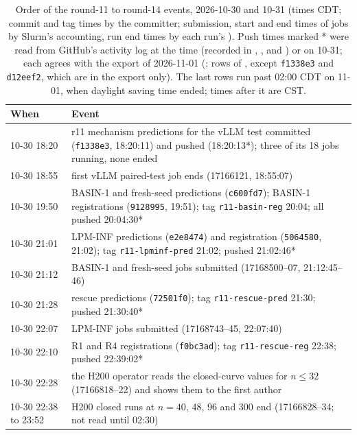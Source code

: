 \begin{table}[tbp]
\centering\footnotesize
\caption{Order of the round-11 to round-14 events, 2026-10-30 and 10-31 (times CDT; commit and tag times by the committer; submission, start and end times of jobs by Slurm's accounting, run end times by each run's ). Push times marked * were read from GitHub's activity log at the time (recorded in , , and ) or on 10-31; each agrees with the export of 2026-11-01 (; rows of , except \texttt{f1338e3} and \texttt{d12eef2}, which are in the export only). The last rows run past 02:00 CDT on 11-01, when daylight saving time ended; times after it are CST.}\label{tab:timeline-r11}
\begin{tabular}{@{}p{2.3cm} >{\raggedright\arraybackslash}p{14.4cm}@{}}
\toprule
When & Event\\
\midrule
10-30 18:20 & r11 mechanism predictions for the vLLM test committed (\texttt{f1338e3}, 18:20:11) and pushed (18:20:13*); three of its 18 jobs running, none ended\\
10-30 18:55 & first vLLM paired-test job ends (17166121, 18:55:07)\\
10-30 19:50 & BASIN-1 and fresh-seed predictions (\texttt{c600fd7}); BASIN-1 registrations (\texttt{9128995}, 19:51); tag \texttt{r11-basin-reg} 20:04; all pushed 20:04:30*\\
10-30 21:01 & LPM-INF predictions (\texttt{e2e8474}) and registration (\texttt{5064580}, 21:02); tag \texttt{r11-lpminf-pred} 21:02; pushed 21:02:46*\\
10-30 21:12 & BASIN-1 and fresh-seed jobs submitted (17168500--07, 21:12:45--46)\\
10-30 21:28 & rescue predictions (\texttt{72501f0}); tag \texttt{r11-rescue-pred} 21:30; pushed 21:30:40*\\
10-30 22:07 & LPM-INF jobs submitted (17168743--45, 22:07:40)\\
10-30 22:10 & R1 and R4 registrations (\texttt{f0bc3ad}); tag \texttt{r11-rescue-reg} 22:38; pushed 22:39:02*\\
10-30 22:28 & the H200 operator reads the closed-curve values for $n\le32$ (17166818--22) and shows them to the first author\\
10-30 22:38 to 23:52 & H200 closed runs at $n=40$, 48, 96 and 300 end (17166828--34; not read until 02:30)\\

\end{tabular}
\end{table}
